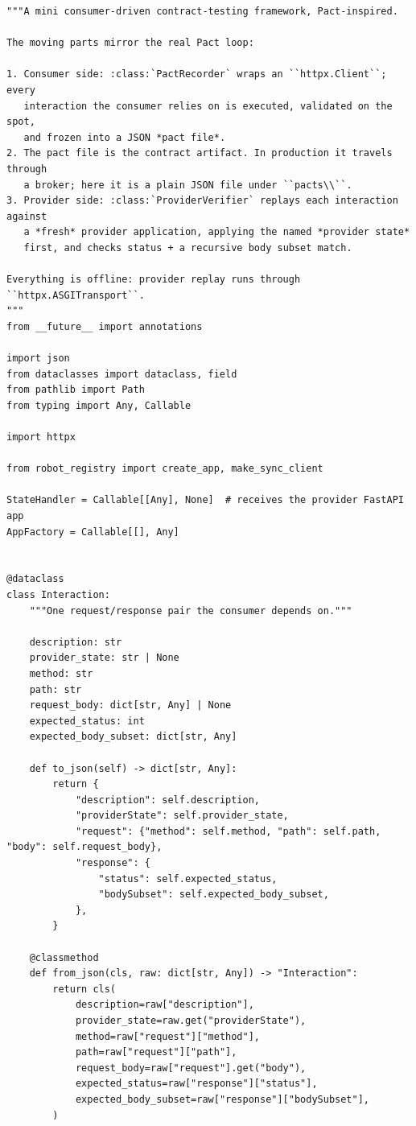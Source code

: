 \begin{verbatim}
"""A mini consumer-driven contract-testing framework, Pact-inspired.

The moving parts mirror the real Pact loop:

1. Consumer side: :class:`PactRecorder` wraps an ``httpx.Client``; every
   interaction the consumer relies on is executed, validated on the spot,
   and frozen into a JSON *pact file*.
2. The pact file is the contract artifact. In production it travels through
   a broker; here it is a plain JSON file under ``pacts\\``.
3. Provider side: :class:`ProviderVerifier` replays each interaction against
   a *fresh* provider application, applying the named *provider state*
   first, and checks status + a recursive body subset match.

Everything is offline: provider replay runs through ``httpx.ASGITransport``.
"""
from __future__ import annotations

import json
from dataclasses import dataclass, field
from pathlib import Path
from typing import Any, Callable

import httpx

from robot_registry import create_app, make_sync_client

StateHandler = Callable[[Any], None]  # receives the provider FastAPI app
AppFactory = Callable[[], Any]


@dataclass
class Interaction:
    """One request/response pair the consumer depends on."""

    description: str
    provider_state: str | None
    method: str
    path: str
    request_body: dict[str, Any] | None
    expected_status: int
    expected_body_subset: dict[str, Any]

    def to_json(self) -> dict[str, Any]:
        return {
            "description": self.description,
            "providerState": self.provider_state,
            "request": {"method": self.method, "path": self.path, "body": self.request_body},
            "response": {
                "status": self.expected_status,
                "bodySubset": self.expected_body_subset,
            },
        }

    @classmethod
    def from_json(cls, raw: dict[str, Any]) -> "Interaction":
        return cls(
            description=raw["description"],
            provider_state=raw.get("providerState"),
            method=raw["request"]["method"],
            path=raw["request"]["path"],
            request_body=raw["request"].get("body"),
            expected_status=raw["response"]["status"],
            expected_body_subset=raw["response"]["bodySubset"],
        )



\end{verbatim}

